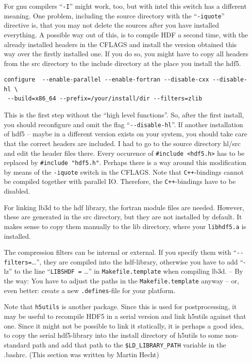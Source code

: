 \documentclass[a4paper]{article}
\begin{document}
For gnu compilers ``\verb+-I+'' might work, too, but with intel this switch has 
a different meaning. One problem, including the source
directory with the ``\verb+-iquote+'' directive is, that you may not delete the sources
after you have installed everything. A possible way out of this, is to compile HDF a 
second time, with the already installed headers in the CFLAGS and install the 
version obtained this way over the firstly installed one. If you do so, you might 
have to copy all headers from the src directory to the include directory at the 
place you install the hdf5.

\begin{verbatim}
configure  --enable-parallel --enable-fortran --disable-cxx --disable-hl \
 --build=x86_64 --prefix=/your/install/dir --filters=zlib
\end{verbatim}

This is the first step without the ``high level functions''. So, after the 
first install, you should reconfigure and omit the flag ``\verb+--disable-hl+''. 
If another installation of hdf5 -- maybe in a different version
exists on your system, you should take care that the correct headers are included.
I had to go to the source directory hl/src and edit the header files there. Every
occurence of \verb+#include <hdf5.h>+ has to be replaced by \verb+#include "hdf5.h"+.
Perhaps there is a way around this modification by means of the \verb+-iquote+ switch
in the CFLAGS. Note that \verb/C++/-bindings cannot be compiled together with 
parallel IO. Therefore, the \verb/C++/-bindings have to be disabled.

For linking lb3d to the hdf library, the fortran module files are needed. However, 
these are generated in the src directory, but they are not installed by default.
It makes sense to copy them manually to the lib directory, where your \verb+libhdf5.a+
is installed.

The compression filters can be internal or external. If you specify them with 
``\verb+--filters=+\dots'', they are compiled into the hdf-library, otherwise you 
have to add ``-lz'' to the line ``\verb+LIBSHDF =+ \dots'' 
in \verb+Makefile.template+  when 
compiling lb3d. -- By the way: You have to adjust the paths in the  \verb+Makefile.template+ anyway -- or, even better: create a new \verb+.defines+-file
for your platform.

Note that \verb|h5utils| is another package. Since this is used for postprocessing,
it may be useful to recompile HDF5 in a serial version and link h5utils against 
that one. Since it might not be possible to link it statically, it is perhaps a
good idea, to copy the serial hdf5-library into the install directory of h5utils
to some non-standard path and add that path to the \verb+$LD_LIBRARY_PATH+ variable in
the .bashrc. (This section was written by Martin Hecht)
\end{document}
